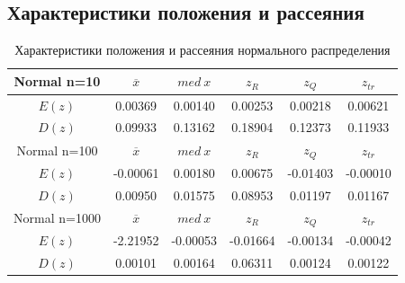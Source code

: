\subsection{Характеристики положения и рассеяния}


 

\begin{table}[H]
	\begin{center}
		\begin{tabular}{|c||c|c|c|c|c|}
			\hline
			Normal n=10 & $\overline{x} $ & $med\:x$ & $z_{R}$ & $z_{Q}$ & $z_{tr}$ \\
			\hline\hline
			$E(z)$ & 0.00369 & 0.00140 & 0.00253 & 0.00218 & 0.00621 \\
			\hline
			$D(z)$ & 0.09933 & 0.13162 & 0.18904 & 0.12373 & 0.11933 \\
			\hline\hline
			Normal n=100 & $\overline{x} $ & $med\:x$ & $z_{R}$ & $z_{Q}$ & $z_{tr}$ \\
			\hline\hline
			$E(z)$ & -0.00061 & 0.00180 & 0.00675 & -0.01403 & -0.00010 \\
			\hline
			$D(z)$ & 0.00950 & 0.01575&  0.08953& 0.01197 & 0.01167  \\
			\hline\hline
			Normal n=1000 & $\overline{x} $ & $med\:x$ & $z_{R}$ & $z_{Q}$ & $z_{tr}$ \\
			\hline\hline
			$E(z)$ & -2.21952 & -0.00053 & -0.01664 & -0.00134 &   -0.00042 \\
			\hline
			$D(z)$ & 0.00101  & 0.00164 & 0.06311  &0.00124  & 0.00122 \\
			\hline
		\end{tabular}
	\end{center}
	\caption{Характеристики положения и рассеяния нормального распределения}
\end{table} 

